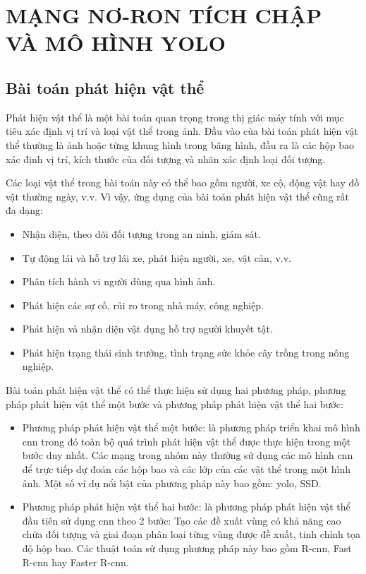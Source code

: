 
\chapter{MẠNG NƠ-RON TÍCH CHẬP VÀ MÔ HÌNH YOLO}

\section{Bài toán phát hiện vật thể}

Phát hiện vật thể là một bài toán quan trọng trong thị giác máy tính với mục tiêu xác định vị trí và loại vật thể trong ảnh. Đầu vào của bài toán phát hiện vật thể thường là ảnh hoặc từng khung hình trong băng hình, đầu ra là các hộp bao xác định vị trí, kích thước của đối tượng và nhãn xác định loại đối tượng.

Các loại vật thể trong bài toán này có thể bao gồm người, xe cộ, động vật hay đồ vật thường ngày, v.v. Vì vậy, ứng dụng của bài toán phát hiện vật thể cũng rất đa dạng:
\begin{itemize}
	\item Nhận diện, theo dõi đối tượng trong an ninh, giám sát.
	\item Tự động lái và hỗ trợ lái xe, phát hiện người, xe, vật cản, v.v.
	\item Phân tích hành vi người dùng qua hình ảnh.
	\item Phát hiện các sự cố, rủi ro trong nhà máy, công nghiệp.
	\item Phát hiện và nhận diện vật dụng hỗ trợ người khuyết tật.
	\item Phát hiện trạng thái sinh trưởng, tình trạng sức khỏe cây trồng trong nông nghiệp.
\end{itemize}

Bài toán phát hiện vật thể có thể thực hiện sử dụng hai phương pháp, phương pháp phát hiện vật thể một bước và phương pháp phát hiện vật thể hai bước\cite{kang2022}:
\begin{itemize}
	\item Phương pháp phát hiện vật thể một bước: là phương pháp triển khai mô hình \acrshort{cnn} trong đó toàn bộ quá trình phát hiện vật thể được thực hiện trong một bước duy nhất. Các mạng trong nhóm này thường sử dụng các mô hình \acrshort{cnn} để trực tiếp dự đoán các hộp bao và các lớp của các vật thể trong một hình ảnh.	Một số ví dụ nổi bật của phương pháp này bao gồm: \acrshort{yolo}, SSD.
	
	\item Phương pháp phát hiện vật thể hai bước: là phương pháp phát hiện vật thể đầu tiên sử dụng \acrshort{cnn} theo 2 bước: Tạo các đề xuất vùng có khả năng cao chứa đối tượng và giai đoạn phân loại từng vùng được đề xuất, tinh chỉnh tọa độ hộp bao. Các thuật toán sử dụng phương pháp này bao gồm R-\acrshort{cnn}, Fast R-\acrshort{cnn} hay Faster R-\acrshort{cnn}.
\end{itemize}

